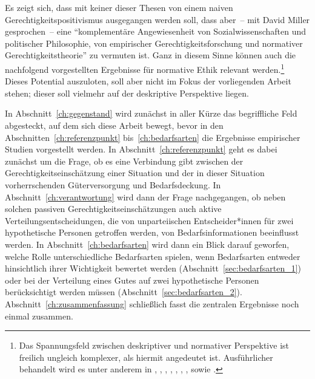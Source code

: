\documentclass[justified,nobib,nohyper,symmetric,twoside]{tufte-book}
\begin{document}
Es zeigt sich, dass mit keiner dieser Thesen von einem naiven Gerechtigkeitspositivismus ausgegangen werden soll, dass aber~-- mit David Miller gesprochen~-- eine \enquote{komplementäre Angewiesenheit von Sozialwissenschaften und politischer Philosophie, von empirischer Gerechtigkeitsforschung und normativer Gerechtigkeitstheorie} \citep[S.~10]{honneth_philosophie_2008} zu vermuten ist.
Ganz in diesem Sinne können auch die nachfolgend vorgestellten Ergebnisse für normative Ethik relevant werden.\footnote[][-1.9cm]{Das Spannungsfeld zwischen deskriptiver und normativer Perspektive ist freilich ungleich komplexer, als hiermit angedeutet ist. Ausführlicher behandelt wird es unter anderem in \citet{appiah_experiments_2009}, \citet{bauer_philosophie_2019,bauer_empirical_2020}, \citet{christen_empirically_2014}, \citet{eckensberger_ethische_1993}, \citet{karageorgoudis_sein_2021}, \citet{luetge_experimental_2014}, \citet{marchetti_facts_2017}, \citet{paulo_empirische_2020} sowie \citet{poelzler_moral_2018}.}
Dieses Potential auszuloten, soll aber nicht im Fokus der vorliegenden Arbeit stehen; dieser soll vielmehr auf der deskriptive Perspektive liegen.

In Abschnitt~\ref{ch:gegenstand} wird zunächst in aller Kürze das begriffliche Feld abgesteckt, auf dem sich diese Arbeit bewegt, bevor in den Abschnitten~\ref{ch:referenzpunkt} bis~\ref{ch:bedarfsarten} die Ergebnisse empirischer Studien vorgestellt werden.
In Abschnitt~\ref{ch:referenzpunkt} geht es dabei zunächst um die Frage, ob es eine Verbindung gibt zwischen der Gerechtigkeitseinschätzung einer Situation und der in dieser Situation vorherrschenden Güterversorgung und Bedarfsdeckung.
In Abschnitt~\ref{ch:verantwortung} wird dann der Frage nachgegangen, ob neben solchen passiven Gerechtigkeitseinschätzungen auch aktive Verteilungsentscheidungen, die von unparteiischen Entscheider*innen für zwei hypothetische Personen getroffen werden, von Bedarfsinformationen beeinflusst werden.
In Abschnitt~\ref{ch:bedarfsarten} wird dann ein Blick darauf geworfen, welche Rolle unterschiedliche Bedarfsarten spielen, wenn Bedarfsarten entweder hinsichtlich ihrer Wichtigkeit bewertet werden (Abschnitt~\ref{sec:bedarfsarten_1}) oder bei der Verteilung eines Gutes auf zwei hypothetische Personen berücksichtigt werden müssen (Abschnitt~\ref{sec:bedarfsarten_2}).
Abschnitt~\ref{ch:zusammenfassung} schließlich fasst die zentralen Ergebnisse noch einmal zusammen.


\end{document}
